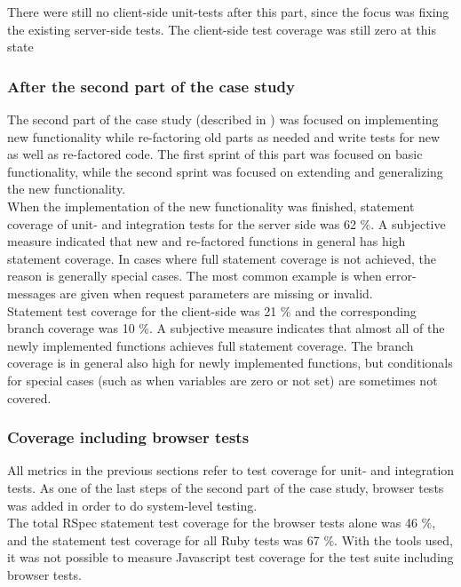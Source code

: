 There were still no client-side unit-tests after this part, since the
focus was fixing the existing server-side tests. The client-side test
coverage was still zero at this state \\

\subsubsection{After the second part of the case study}
\label{sec:result_coverage_end}

The second part of the case study (described in )
was focused on implementing new functionality while re-factoring old
parts as needed and write tests for new as well as re-factored code. The
first sprint of this part was focused on basic functionality, while the
second sprint was focused on extending and generalizing the new
functionality.\\

When the implementation of the new functionality was finished, statement
coverage of unit- and integration tests for the server side was 62 \%. A
subjective measure indicated that new and re-factored functions in
general has high statement coverage. In cases where full statement
coverage is not achieved, the reason is generally special cases. The
most common example is when error-messages are given when request
parameters are missing or invalid.\\

Statement test coverage for the client-side was 21 \% and the
corresponding branch coverage was 10 \%. A subjective measure
indicates that almost all of the newly implemented functions achieves
full statement coverage. The branch coverage is in general also high for
newly implemented functions, but conditionals for special cases (such as
when variables are zero or not set) are sometimes not covered.\\

\subsubsection{Coverage including browser tests}

All metrics in the previous sections refer to test coverage for unit-
and integration tests. As one of the last steps of the second part of
the case study, browser tests was added in order to do system-level
testing.\\

The total RSpec statement test coverage for the browser tests alone was
46 \%, and the statement test coverage for all Ruby tests was 67 \%.
With the tools used, it was not possible to measure Javascript test
coverage for the test suite including browser tests.\\
